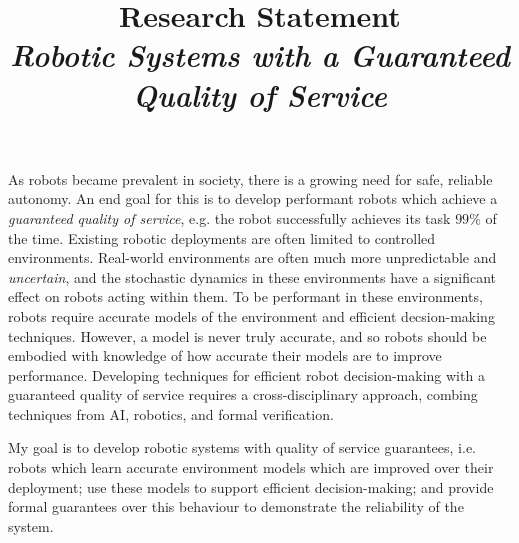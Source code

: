 \documentclass[11pt]{article}
\title{Research Statement\\ \large \emph{Robotic Systems with a Guaranteed Quality of Service}}
\date{}
\author{}
\begin{document}
\maketitle
\thispagestyle{empty}

As robots became prevalent in society, there is a growing need for safe, reliable autonomy.
%
An end goal for this is to develop performant robots which achieve a \emph{guaranteed quality of service}, e.g. the robot successfully achieves its task $99\%$ of the time.
%
Existing robotic deployments are often limited to controlled environments.
%
Real-world environments are often much more unpredictable and \emph{uncertain}, and the stochastic dynamics in these environments have a significant effect on robots acting within them.
%
To be performant in these environments, robots require accurate models of the environment and  efficient decsion-making techniques.
%
However, a model is never truly accurate, and so robots should be embodied with knowledge of how accurate their models are to improve performance.
%
Developing techniques for efficient robot decision-making with a guaranteed quality of service requires a cross-disciplinary approach, combing techniques from AI, robotics, and formal verification.

My goal is to develop robotic systems with quality of service guarantees, i.e. robots which learn accurate environment models which are improved over their deployment; use these models to support efficient decision-making; and provide formal guarantees over this behaviour to demonstrate the reliability of the system.
\end{document}
